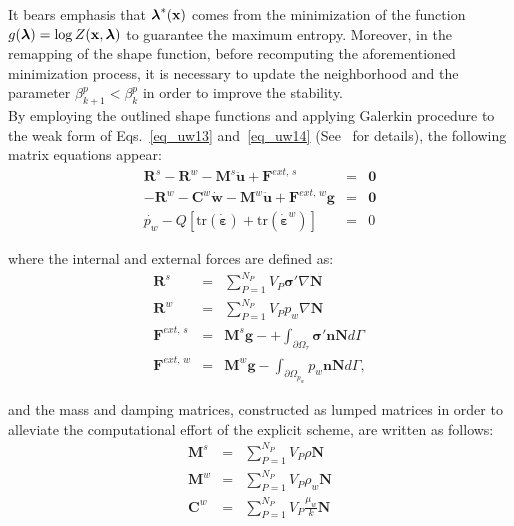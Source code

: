 \documentclass[twocolumn]{svjour3}          %
\begin{document}
It bears emphasis that $\boldsymbol{\lambda}^*(\bf x)$ comes from the minimization of the function $g(\boldsymbol{\lambda})=\log Z(\bf x, \boldsymbol{\lambda})$ to guarantee the maximum entropy. Moreover, in the remapping of the shape function, before recomputing the aforementioned minimization process, it is necessary to update the neighborhood and the parameter $\beta_{k+1}^p < \beta_{k}^p$ in order to improve the stability.\\

By employing the outlined shape functions and applying Galerkin procedure to the weak form of Eqs.~\eqref{eq_uw13} and~\eqref{eq_uw14}
 (See~\cite{Sanavia:02,Sanavia:06} for details), the following matrix equations appear:
 \begin{eqnarray}
 \boldsymbol{R}^s- \boldsymbol{R}^w- \boldsymbol{M}^s \ddot{\boldsymbol{u}} + \boldsymbol{F}^{ext, \, s} &=& \boldsymbol{0} \label{mat1}\\
-\boldsymbol{R}^w- \boldsymbol{C}^w \dot{\boldsymbol{w}} - \boldsymbol{M}^w \ddot{\boldsymbol{u}}+ \boldsymbol{F}^{ext, \, w} \boldsymbol{g} &=&\boldsymbol{0} \label{mat2}\\
\dot{p_w} -Q \left[\mbox{tr}(\dot{\boldsymbol{\varepsilon}}) + \mbox{tr}(\dot{\boldsymbol{\varepsilon}}^w)\right] \label{mat3} &=& 0
 \end{eqnarray}
 
 where the internal and external forces are defined as:
 \begin{eqnarray}
  \boldsymbol{R}^s &=& \sum_{P=1}^{N_{P}} V_{P} \boldsymbol{\sigma'} \nabla \mathbf{N} \nonumber \\
    \boldsymbol{R}^w &=& \sum_{P=1}^{N_{P}} V_{P} p_w \nabla \mathbf{N} \nonumber \\
  \boldsymbol{F}^{ext, \, s} &=& \boldsymbol{M}^s \boldsymbol{g} - +\int_{\partial \Omega_{\tau}} \boldsymbol{\sigma'} \boldsymbol{n}\mathbf{N} d \Gamma\nonumber \\
 \boldsymbol{F}^{ext, \, w} &=& \boldsymbol{M}^w \boldsymbol{g} - \int_{\partial \Omega_{p_w}} p_w \boldsymbol{n} \mathbf{N} d \Gamma, \nonumber
  \end{eqnarray}
  
  and the mass and damping matrices, constructed as lumped matrices in order to alleviate the computational effort of the explicit scheme, are written as follows:
   \begin{eqnarray}
  \boldsymbol{M}^s &=& \sum_{P=1}^{N_{P}} V_{P} \rho \mathbf{N} \nonumber \\
    \boldsymbol{M}^w &=& \sum_{P=1}^{N_{P}} V_{P} \rho_w \mathbf{N} \nonumber \\
        \boldsymbol{C}^w &=& \sum_{P=1}^{N_{P}} V_{P} \frac{\mu_w}{k} \mathbf{N} \nonumber
  \end{eqnarray}
  
\end{document}
